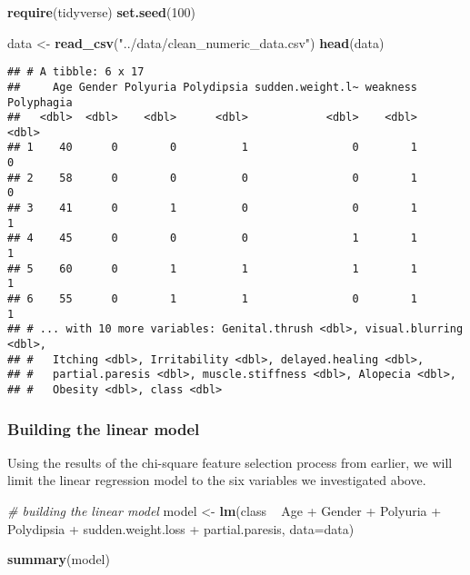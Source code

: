 \documentclass[
]{article}
\newenvironment{Shaded}{}{}
\newcommand{\CommentTok}[1]{\textcolor[rgb]{0.38,0.63,0.69}{\textit{#1}}}
\newcommand{\DataTypeTok}[1]{\textcolor[rgb]{0.56,0.13,0.00}{#1}}
\newcommand{\DecValTok}[1]{\textcolor[rgb]{0.25,0.63,0.44}{#1}}
\newcommand{\KeywordTok}[1]{\textcolor[rgb]{0.00,0.44,0.13}{\textbf{#1}}}
\newcommand{\NormalTok}[1]{#1}
\newcommand{\OperatorTok}[1]{\textcolor[rgb]{0.40,0.40,0.40}{#1}}
\newcommand{\StringTok}[1]{\textcolor[rgb]{0.25,0.44,0.63}{#1}}
\begin{document}
\begin{Shaded}
\begin{Highlighting}[]
\KeywordTok{require}\NormalTok{(tidyverse)}
\KeywordTok{set.seed}\NormalTok{(}\DecValTok{100}\NormalTok{)}

\NormalTok{data <-}\StringTok{ }\KeywordTok{read_csv}\NormalTok{(}\StringTok{"../data/clean_numeric_data.csv"}\NormalTok{)}
\KeywordTok{head}\NormalTok{(data)}
\end{Highlighting}
\end{Shaded}

\begin{verbatim}
## # A tibble: 6 x 17
##     Age Gender Polyuria Polydipsia sudden.weight.l~ weakness Polyphagia
##   <dbl>  <dbl>    <dbl>      <dbl>            <dbl>    <dbl>      <dbl>
## 1    40      0        0          1                0        1          0
## 2    58      0        0          0                0        1          0
## 3    41      0        1          0                0        1          1
## 4    45      0        0          0                1        1          1
## 5    60      0        1          1                1        1          1
## 6    55      0        1          1                0        1          1
## # ... with 10 more variables: Genital.thrush <dbl>, visual.blurring <dbl>,
## #   Itching <dbl>, Irritability <dbl>, delayed.healing <dbl>,
## #   partial.paresis <dbl>, muscle.stiffness <dbl>, Alopecia <dbl>,
## #   Obesity <dbl>, class <dbl>
\end{verbatim}

\hypertarget{header-n913}{%
\subsubsection{Building the linear model}\label{header-n913}}

Using the results of the chi-square feature selection process from
earlier, we will limit the linear regression model to the six variables
we investigated above.

\begin{Shaded}
\begin{Highlighting}[]
\CommentTok{# building the linear model}
\NormalTok{model <-}\StringTok{ }\KeywordTok{lm}\NormalTok{(class }\OperatorTok{~}\StringTok{ }\NormalTok{Age }\OperatorTok{+}\StringTok{ }\NormalTok{Gender }\OperatorTok{+}\StringTok{ }\NormalTok{Polyuria }\OperatorTok{+}\StringTok{ }\NormalTok{Polydipsia }\OperatorTok{+}\StringTok{ }\NormalTok{sudden.weight.loss }\OperatorTok{+}\StringTok{ }\NormalTok{partial.paresis, }\DataTypeTok{data=}\NormalTok{data)}

\KeywordTok{summary}\NormalTok{(model)}
\end{Highlighting}
\end{Shaded}
\end{document}
